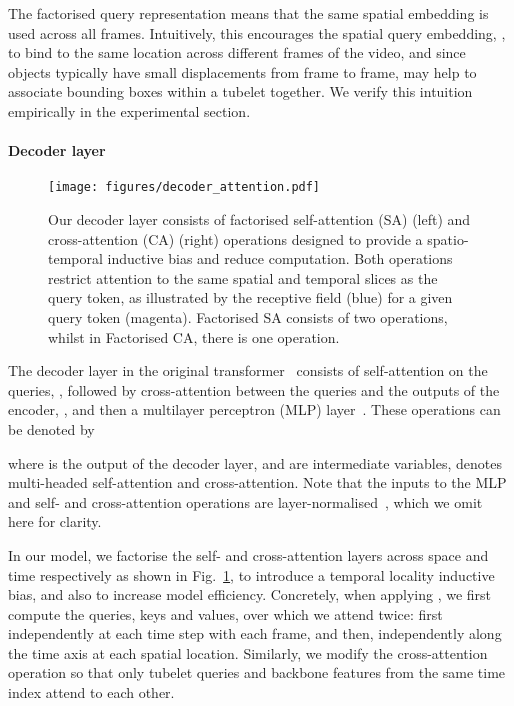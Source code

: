 \documentclass[10pt,twocolumn,letterpaper]{article}
\def \paravspace {-0.7\baselineskip}
\begin{document}
The factorised query representation means that the same spatial embedding is used across all frames.
Intuitively, this encourages the  spatial query embedding, , to bind to the same location across different frames of the video, and since objects typically have small displacements from frame to frame, may help to associate bounding boxes within a tubelet together. We verify this intuition empirically in the experimental section. 

\vspace{\paravspace}
\paragraph{Decoder layer}

\begin{figure}[t]
	\vspace{-0.5\baselineskip}
	\texttt{[image: figures/decoder\_attention.pdf]}
	\caption{
		Our decoder layer consists of factorised self-attention (SA) (left) and cross-attention (CA) (right) operations designed to provide a spatio-temporal inductive bias and reduce computation. Both operations restrict attention to the same spatial and temporal slices as the query token, as illustrated by the receptive field (blue) for a given query token (magenta).
		Factorised SA consists of two operations, whilst in Factorised CA, there is one operation.
	}
	\vspace{-\baselineskip}
	\label{fig:model_decoder}
\end{figure} 
The decoder layer in the original transformer~\cite{vaswani_neurips_2017} consists of self-attention on the queries, , followed by cross-attention between the queries and the outputs of the encoder, , and then a multilayer perceptron (MLP) layer~\cite{vaswani_neurips_2017, hendrycks_arxiv_2016}.
These operations can be denoted by

where  is the output of the  decoder layer,  and  are intermediate variables,  denotes multi-headed self-attention and  cross-attention.  Note that the inputs to the MLP and self- and cross-attention operations are layer-normalised~\cite{ba_arxiv_2016}, which we omit here for clarity. 

In our model, we factorise the self- and cross-attention layers across space and time respectively as shown in Fig.~\ref{fig:model_decoder}, to introduce a temporal locality inductive bias, and also to increase model efficiency.
Concretely, when applying , we first compute the queries, keys and values, over which we attend twice: first independently at each time step with each frame, and then, independently along the time axis at each spatial location.
Similarly, we modify the cross-attention operation so that only tubelet queries and backbone features from the same time index attend to each other.
\end{document}
